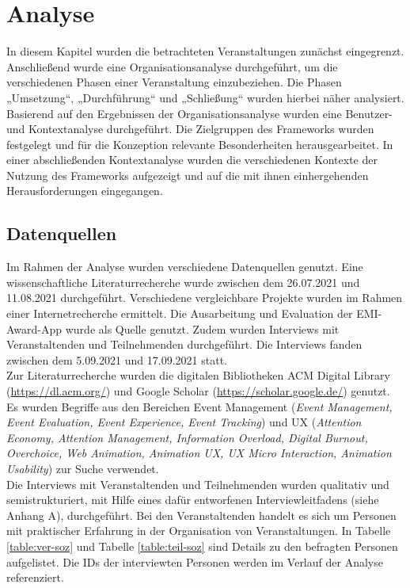 \chapter{Analyse}

In diesem Kapitel wurden die betrachteten Veranstaltungen zunächst eingegrenzt.
Anschließend wurde eine Organisationsanalyse durchgeführt, um die verschiedenen
Phasen einer Veranstaltung einzubeziehen. Die Phasen „Umsetzung“, „Durchführung“
und „Schließung“ wurden hierbei näher analysiert. Basierend auf den Ergebnissen
der Organisationsanalyse wurden eine Benutzer- und Kontextanalyse durchgeführt.
Die Zielgruppen des Frameworks wurden festgelegt und für die Konzeption
relevante Besonderheiten herausgearbeitet. In einer abschließenden
Kontextanalyse wurden die verschiedenen Kontexte der Nutzung des Frameworks
aufgezeigt und auf die mit ihnen einhergehenden Herausforderungen eingegangen.


\section{Datenquellen}

Im Rahmen der Analyse wurden verschiedene Datenquellen genutzt. Eine
wissenschaftliche Literaturrecherche wurde zwischen dem 26.07.2021 und
11.08.2021 durchgeführt. Verschiedene vergleichbare Projekte wurden im Rahmen
einer Internetrecherche ermittelt. Die Ausarbeitung und Evaluation der
EMI-Award-App wurde als Quelle genutzt. Zudem wurden Interviews mit
Veranstaltenden und Teilnehmenden durchgeführt. Die Interviews fanden zwischen
dem 5.09.2021 und 17.09.2021 statt. \\
Zur Literaturrecherche wurden die digitalen Bibliotheken ACM Digital Library
(\url{https://dl.acm.org/}) und Google Scholar
(\url{https://scholar.google.de/}) genutzt. Es wurden Begriffe aus den Bereichen
Event Management (\emph{Event Management, Event Evaluation, Event Experience,
    Event Tracking}) und UX (\emph{Attention Economy, Attention Management,
    Information Overload, Digital Burnout, Overchoice, Web Animation, Animation UX,
    UX Micro Interaction, Animation Usability}) zur Suche verwendet. \\
Die Interviews mit Veranstaltenden und Teilnehmenden wurden qualitativ und
semistrukturiert, mit Hilfe eines dafür entworfenen Interviewleitfadens (siehe
Anhang A), durchgeführt. Bei den Veranstaltenden handelt es sich um Personen mit
praktischer Erfahrung in der Organisation von Veranstaltungen. In Tabelle
\ref{table:ver-soz} und Tabelle \ref{table:teil-soz} sind Details zu den
befragten Personen aufgelistet. Die IDs der interviewten Personen werden im
Verlauf der Analyse referenziert.

